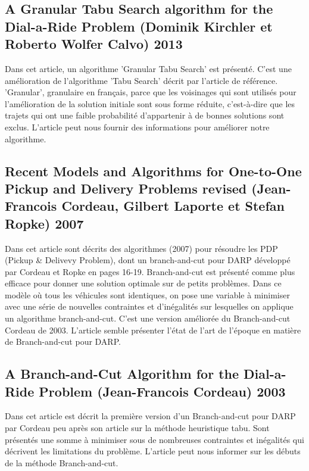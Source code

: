 \documentclass[10pt,a4paper]{report}
\begin{document}
\subsection*{A Granular Tabu Search algorithm for the Dial-a-Ride Problem (Dominik Kirchler et Roberto Wolfer Calvo) 2013}
Dans cet article, un algorithme 'Granular Tabu Search' est présenté. C'est une amélioration de l'algorithme 'Tabu Search' décrit par l'article de référence. 'Granular', granulaire en français, parce que les voisinages qui sont utilisés pour l'amélioration de la solution initiale sont sous forme réduite, c'est-à-dire que les trajets qui ont une faible probabilité d'appartenir à de bonnes solutions sont exclus. L'article peut nous fournir des informations pour améliorer notre algorithme.
\subsection*{Recent Models and Algorithms for One-to-One Pickup and Delivery Problems revised (Jean-Francois Cordeau, Gilbert Laporte et Stefan Ropke) 2007}
Dans cet article sont décrits des algorithmes (2007) pour résoudre les PDP (Pickup \& Delivevy Problem), dont un branch-and-cut pour DARP développé par Cordeau et Ropke en pages 16-19. Branch-and-cut est présenté comme plus efficace pour donner une solution optimale sur de petits problèmes. 
Dans ce modèle où tous les véhicules sont identiques, on pose une variable à minimiser avec une série de nouvelles contraintes et d'inégalités sur lesquelles on applique un algorithme branch-and-cut. C'est une version améliorée du Branch-and-cut Cordeau de 2003. 
L'article semble présenter l'état de l'art de l'époque en matière de Branch-and-cut pour DARP.
\subsection*{A Branch-and-Cut Algorithm for the Dial-a-Ride Problem (Jean-Francois Cordeau) 2003}
Dans cet article est décrit la première version d'un Branch-and-cut pour DARP par Cordeau peu après son article sur la méthode heuristique tabu. Sont présentés une somme à minimiser sous de nombreuses contraintes et inégalités qui décrivent les limitations du problème. L'article peut nous informer sur les débuts de la méthode Branch-and-cut.
\end{document}
